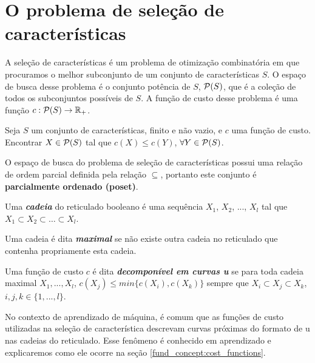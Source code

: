 
\section{O problema de seleção de características}
A seleção de características é um problema de otimização combinatória 
em que procuramos o melhor subconjunto de um conjunto de características
$S$. O espaço de busca desse problema é o conjunto potência de $S$, 
$\mathcal{P} (S)$, que é a coleção de todos os subconjuntos possíveis de
 $S$. A função de custo desse problema é uma função $c : \mathcal{P} (S) 
\to \mathbb{R}_{+}$.

\begin{mydefinition} Seja $S$
um conjunto de características, finito e não vazio, e $c$ uma função de 
custo. Encontrar $X \in \mathcal{P} (S)$ tal que $c (X) \leq c (Y)$,
$\forall Y \in \mathcal{P} (S)$.
\end{mydefinition}

O espaço de busca do problema de seleção de características possui uma
relação de ordem parcial definida pela relação $\subseteq$, portanto
este conjunto é {\bf parcialmente ordenado (poset)}.

\begin{mydefinition}
Uma {\bf \em cadeia} do reticulado booleano é uma sequência $X_1$, 
$X_2$, ..., $X_l$ tal que $X_1 \subset X_2 \subset \dots \subset X_l$.
\end{mydefinition}

\begin{mydefinition}
Uma cadeia é dita {\bf \em maximal} se não existe outra cadeia no 
reticulado que contenha propriamente esta cadeia.
\end{mydefinition}

\begin{mydefinition}
Uma função de custo $c$ é dita {\bf \em decomponível em curvas u} se
para toda cadeia maximal $X_1, ..., X_l$, $c(X_j) \leq min \{c (X_i),
c (X_k)\}$ sempre que $X_i \subset X_j \subset X_k$, $i, j, k \in 
\{1, ..., l\}$.
\end{mydefinition}

No contexto de aprendizado de máquina, é comum que as funções de custo
utilizadas na seleção de característica descrevam curvas próximas do 
formato de u nas cadeias do reticulado. Esse fenômeno é conhecido em 
aprendizado e explicaremos como ele ocorre na seção 
\ref{fund_concept:cost_functions}.

